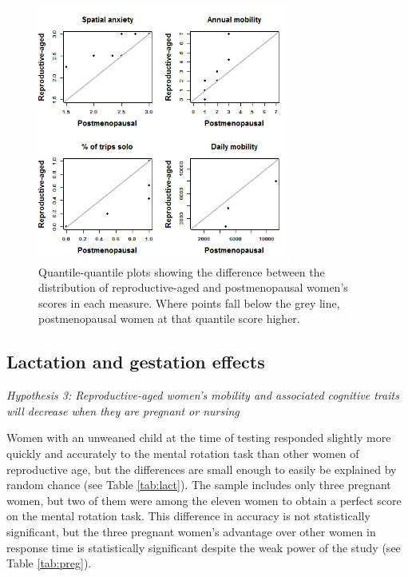 \begin{figure}[!htb]
  \includegraphics[width=0.75\textwidth]{QQ_pst}
\caption{Quantile-quantile plots showing the difference between the distribution of reproductive-aged and postmenopausal women's scores in each measure. Where points fall below the grey line, postmenopausal women at that quantile score higher.}
\label{fig:meno}       %
\end{figure}


	\subsection{Lactation and gestation effects}
	\label{sec:3.3}
	
\emph{Hypothesis 3:  Reproductive-aged women's mobility and associated cognitive traits will decrease when they are pregnant or nursing}
	\smallskip

Women with an unweaned child at the time of testing responded slightly more quickly and accurately to the mental rotation task than other women of reproductive age, but the differences are small enough to easily be explained by random chance (see Table \ref{tab:lact}).  The sample includes only three pregnant women, but two of them were among the eleven women to obtain a perfect score on the mental rotation task.  This difference in accuracy is not statistically significant, but the three pregnant women's advantage over other women in response time is statistically significant despite the weak power of the study (see Table \ref{tab:preg}).  

